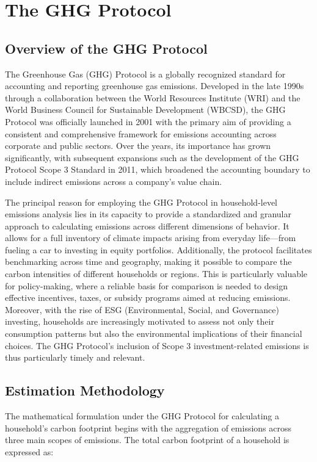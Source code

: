 \documentclass[12pt,a4paper]{article}%
\begin{document}
\section{The GHG Protocol}
\subsection{Overview of the GHG Protocol}
The Greenhouse Gas (GHG) Protocol is a globally recognized standard for accounting and reporting greenhouse gas emissions. Developed in the late 1990s through a collaboration between the World Resources Institute (WRI) and the World Business Council for Sustainable Development (WBCSD), the GHG Protocol was officially launched in 2001 with the primary aim of providing a consistent and comprehensive framework for emissions accounting across corporate and public sectors. Over the years, its importance has grown significantly, with subsequent expansions such as the development of the GHG Protocol Scope 3 Standard in 2011, which broadened the accounting boundary to include indirect emissions across a company’s value chain. 

The principal reason for employing the GHG Protocol in household-level emissions analysis lies in its capacity to provide a standardized and granular approach to calculating emissions across different dimensions of behavior. It allows for a full inventory of climate impacts arising from everyday life—from fueling a car to investing in equity portfolios. Additionally, the protocol facilitates benchmarking across time and geography, making it possible to compare the carbon intensities of different households or regions. This is particularly valuable for policy-making, where a reliable basis for comparison is needed to design effective incentives, taxes, or subsidy programs aimed at reducing emissions. Moreover, with the rise of ESG (Environmental, Social, and Governance) investing, households are increasingly motivated to assess not only their consumption patterns but also the environmental implications of their financial choices. The GHG Protocol's inclusion of Scope 3 investment-related emissions is thus particularly timely and relevant.

\subsection{Estimation Methodology}

The mathematical formulation under the GHG Protocol for calculating a household’s carbon footprint begins with the aggregation of emissions across three main scopes of emissions. The total carbon footprint of a household is expressed as:
\end{document}
